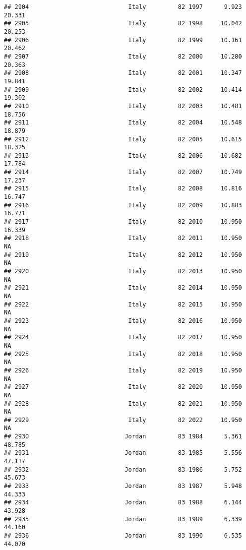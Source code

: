 \documentclass[
]{article}
\begin{document}
\begin{verbatim}
## 2904                            Italy         82 1997      9.923     20.331
## 2905                            Italy         82 1998     10.042     20.253
## 2906                            Italy         82 1999     10.161     20.462
## 2907                            Italy         82 2000     10.280     20.363
## 2908                            Italy         82 2001     10.347     19.841
## 2909                            Italy         82 2002     10.414     19.302
## 2910                            Italy         82 2003     10.481     18.756
## 2911                            Italy         82 2004     10.548     18.879
## 2912                            Italy         82 2005     10.615     18.325
## 2913                            Italy         82 2006     10.682     17.784
## 2914                            Italy         82 2007     10.749     17.237
## 2915                            Italy         82 2008     10.816     16.747
## 2916                            Italy         82 2009     10.883     16.771
## 2917                            Italy         82 2010     10.950     16.339
## 2918                            Italy         82 2011     10.950         NA
## 2919                            Italy         82 2012     10.950         NA
## 2920                            Italy         82 2013     10.950         NA
## 2921                            Italy         82 2014     10.950         NA
## 2922                            Italy         82 2015     10.950         NA
## 2923                            Italy         82 2016     10.950         NA
## 2924                            Italy         82 2017     10.950         NA
## 2925                            Italy         82 2018     10.950         NA
## 2926                            Italy         82 2019     10.950         NA
## 2927                            Italy         82 2020     10.950         NA
## 2928                            Italy         82 2021     10.950         NA
## 2929                            Italy         82 2022     10.950         NA
## 2930                           Jordan         83 1984      5.361     48.785
## 2931                           Jordan         83 1985      5.556     47.117
## 2932                           Jordan         83 1986      5.752     45.673
## 2933                           Jordan         83 1987      5.948     44.333
## 2934                           Jordan         83 1988      6.144     43.928
## 2935                           Jordan         83 1989      6.339     44.160
## 2936                           Jordan         83 1990      6.535     44.070

\end{verbatim}
\end{document}
